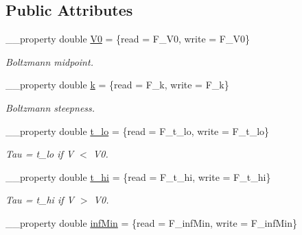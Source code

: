 \subsection*{Public Attributes}
\begin{DoxyCompactItemize}
\item 
\hypertarget{class_t_h_h_kinetics_factor_a51011210d4c23871a4257869d0d75ed9}{\+\_\+\+\_\+property double \hyperlink{class_t_h_h_kinetics_factor_a51011210d4c23871a4257869d0d75ed9}{V0} = \{read = F\+\_\+\+V0, write = F\+\_\+\+V0\}}\label{class_t_h_h_kinetics_factor_a51011210d4c23871a4257869d0d75ed9}

\begin{DoxyCompactList}\small\item\em Boltzmann midpoint. \end{DoxyCompactList}\item 
\hypertarget{class_t_h_h_kinetics_factor_a1d1f9f150dcb3145081ae16b5d25c494}{\+\_\+\+\_\+property double \hyperlink{class_t_h_h_kinetics_factor_a1d1f9f150dcb3145081ae16b5d25c494}{k} = \{read = F\+\_\+k, write = F\+\_\+k\}}\label{class_t_h_h_kinetics_factor_a1d1f9f150dcb3145081ae16b5d25c494}

\begin{DoxyCompactList}\small\item\em Boltzmann steepness. \end{DoxyCompactList}\item 
\hypertarget{class_t_h_h_kinetics_factor_ae9eacad1dc1ceb9c4012fdd120468f94}{\+\_\+\+\_\+property double \hyperlink{class_t_h_h_kinetics_factor_ae9eacad1dc1ceb9c4012fdd120468f94}{t\+\_\+lo} = \{read = F\+\_\+t\+\_\+lo, write = F\+\_\+t\+\_\+lo\}}\label{class_t_h_h_kinetics_factor_ae9eacad1dc1ceb9c4012fdd120468f94}

\begin{DoxyCompactList}\small\item\em Tau = t\+\_\+lo if V $<$ V0. \end{DoxyCompactList}\item 
\hypertarget{class_t_h_h_kinetics_factor_a9c9452cee4694ef97bd6185f3804175b}{\+\_\+\+\_\+property double \hyperlink{class_t_h_h_kinetics_factor_a9c9452cee4694ef97bd6185f3804175b}{t\+\_\+hi} = \{read = F\+\_\+t\+\_\+hi, write = F\+\_\+t\+\_\+hi\}}\label{class_t_h_h_kinetics_factor_a9c9452cee4694ef97bd6185f3804175b}

\begin{DoxyCompactList}\small\item\em Tau = t\+\_\+hi if V $>$ V0. \end{DoxyCompactList}\item 
\hypertarget{class_t_h_h_kinetics_factor_a1b10015523eb510c8670a4514abcd543}{\+\_\+\+\_\+property double \hyperlink{class_t_h_h_kinetics_factor_a1b10015523eb510c8670a4514abcd543}{inf\+Min} = \{read = F\+\_\+inf\+Min, write = F\+\_\+inf\+Min\}}\label{class_t_h_h_kinetics_factor_a1b10015523eb510c8670a4514abcd543}


\end{DoxyCompactItemize}
